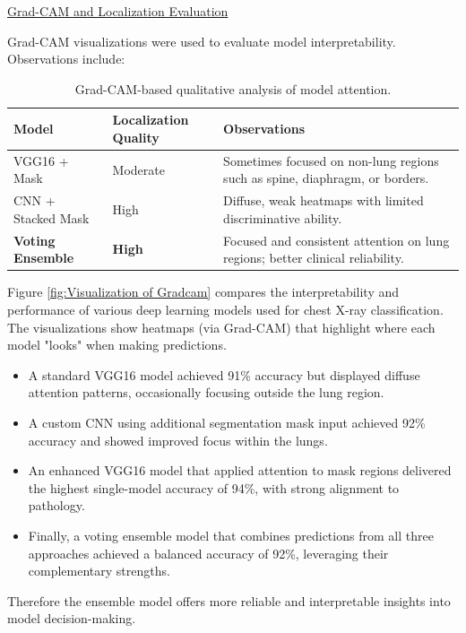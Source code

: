 \documentclass{article}
\begin{document}
\underline{Grad-CAM and Localization Evaluation}

Grad-CAM visualizations were used to evaluate model interpretability. Observations include:

\begin{table}[H]
\centering
\begin{tabular}{|l|l|p{8cm}|}
\hline
\textbf{Model} & \textbf{Localization Quality} & \textbf{Observations} \\
\hline
VGG16 + Mask & Moderate  & Sometimes focused on non-lung regions such as spine, diaphragm, or borders. \\
\hline
CNN + Stacked Mask & High  & Diffuse, weak heatmaps with limited discriminative ability. \\
\hline
\textbf{Voting Ensemble} & \textbf{High} & Focused and consistent attention on lung regions; better clinical reliability. \\
\hline
\end{tabular}
\caption{Grad-CAM-based qualitative analysis of model attention.}
\end{table}



Figure \ref{fig:Visualization of Gradcam} compares the interpretability and performance of various deep learning models used for chest X-ray classification. The visualizations show heatmaps (via Grad-CAM) that highlight where each model "looks" when making predictions.

\begin{itemize}
    \item A standard VGG16 model achieved 91\% accuracy but displayed diffuse attention patterns, occasionally focusing outside the lung region.
    \item A custom CNN using additional segmentation mask input achieved 92\% accuracy and showed improved focus within the lungs.
    \item An enhanced VGG16 model that applied attention to mask regions delivered the highest single-model accuracy of 94\%, with strong alignment to pathology.
     \item Finally, a voting ensemble model that combines predictions from all three approaches achieved a balanced accuracy of 92\%, leveraging their complementary strengths.
\end{itemize}

Therefore the ensemble model offers more reliable and interpretable insights into model decision-making.
\end{document}
